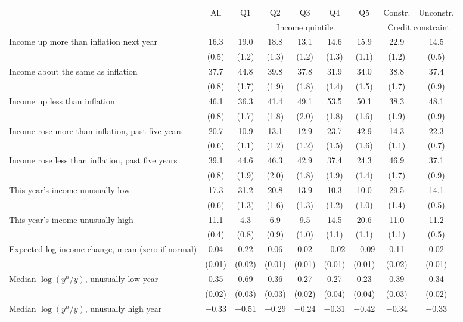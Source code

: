 \begin{tabular}{lcccccccc}
\toprule
 & All & Q1 & Q2 & Q3 & Q4 & Q5 & Constr. & Unconstr. \\
 & & \multicolumn{5}{c}{Income quintile} & \multicolumn{2}{c}{Credit constraint} \\
\cmidrule(lr){3-7} \cmidrule(lr){8-9}
\midrule
Income up more than inflation next year & 16.3 & 19.0 & 18.8 & 13.1 & 14.6 & 15.9 & 22.9 & 14.5 \\
 & (0.5) & (1.2) & (1.3) & (1.2) & (1.3) & (1.1) & (1.2) & (0.5) \\
Income about the same as inflation & 37.7 & 44.8 & 39.8 & 37.8 & 31.9 & 34.0 & 38.8 & 37.4 \\
 & (0.8) & (1.7) & (1.9) & (1.8) & (1.4) & (1.5) & (1.7) & (0.9) \\
Income up less than inflation & 46.1 & 36.3 & 41.4 & 49.1 & 53.5 & 50.1 & 38.3 & 48.1 \\
 & (0.8) & (1.7) & (1.8) & (2.0) & (1.8) & (1.6) & (1.9) & (0.9) \\
Income rose more than inflation, past five years & 20.7 & 10.9 & 13.1 & 12.9 & 23.7 & 42.9 & 14.3 & 22.3 \\
 & (0.6) & (1.1) & (1.2) & (1.2) & (1.5) & (1.6) & (1.1) & (0.7) \\
Income rose less than inflation, past five years & 39.1 & 44.6 & 46.3 & 42.9 & 37.4 & 24.3 & 46.9 & 37.1 \\
 & (0.8) & (1.9) & (2.0) & (1.8) & (1.9) & (1.4) & (1.7) & (0.9) \\
This year's income unusually low & 17.3 & 31.2 & 20.8 & 13.9 & 10.3 & 10.0 & 29.5 & 14.1 \\
 & (0.6) & (1.3) & (1.6) & (1.3) & (1.2) & (1.0) & (1.4) & (0.5) \\
This year's income unusually high & 11.1 & 4.3 & 6.9 & 9.5 & 14.5 & 20.6 & 11.0 & 11.2 \\
 & (0.4) & (0.8) & (0.9) & (1.0) & (1.1) & (1.1) & (1.1) & (0.5) \\
Expected log income change, mean (zero if normal) & 0.04 & 0.22 & 0.06 & 0.02 & $-$0.02 & $-$0.09 & 0.11 & 0.02 \\
 & (0.01) & (0.02) & (0.01) & (0.01) & (0.01) & (0.01) & (0.02) & (0.01) \\
Median $\log(y^{n}/y)$, unusually low year & 0.35 & 0.69 & 0.36 & 0.27 & 0.27 & 0.23 & 0.39 & 0.34 \\
 & (0.02) & (0.03) & (0.03) & (0.02) & (0.04) & (0.04) & (0.03) & (0.02) \\
Median $\log(y^{n}/y)$, unusually high year & $-$0.33 & $-$0.51 & $-$0.29 & $-$0.24 & $-$0.31 & $-$0.42 & $-$0.34 & $-$0.33 \\

\end{tabular}
